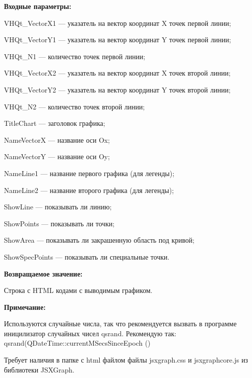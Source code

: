 \textbf{Входные параметры:}
 
    VHQt\_VectorX1 --- указатель на вектор координат X точек первой линии;
 
    VHQt\_VectorY1 --- указатель на вектор координат Y точек первой линии;
 
    VHQt\_N1 --- количество точек первой линии;
 
    VHQt\_VectorX2 --- указатель на вектор координат X точек второй линии;
 
    VHQt\_VectorY2 --- указатель на вектор координат Y точек второй линии;
 
    VHQt\_N2 --- количество точек второй линии;
 
    TitleChart --- заголовок графика;
 
    NameVectorX --- название оси Ox;
 
    NameVectorY --- название оси Oy;
 
    NameLine1 --- название первого графика (для легенды);
 
    NameLine2 --- название второго графика (для легенды);
 
    ShowLine --- показывать ли линию;
 
    ShowPoints --- показывать ли точки;
 
    ShowArea --- показывать ли закрашенную область под кривой;
 
    ShowSpecPoints --- показывать ли специальные точки.

\textbf{Возвращаемое значение:}

Строка с HTML кодами с выводимым графиком.

\textbf{Примечание:}

Используются случайные числа, так что рекомендуется вызвать в программе иницилизатор случайных чисел qsrand. Рекомендую так: qsrand(QDateTime::currentMSecsSinceEpoch () %

Требует наличия в папке с html файлом файлы jsxgraph.css и jsxgraphcore.js из библиотеки JSXGraph.
